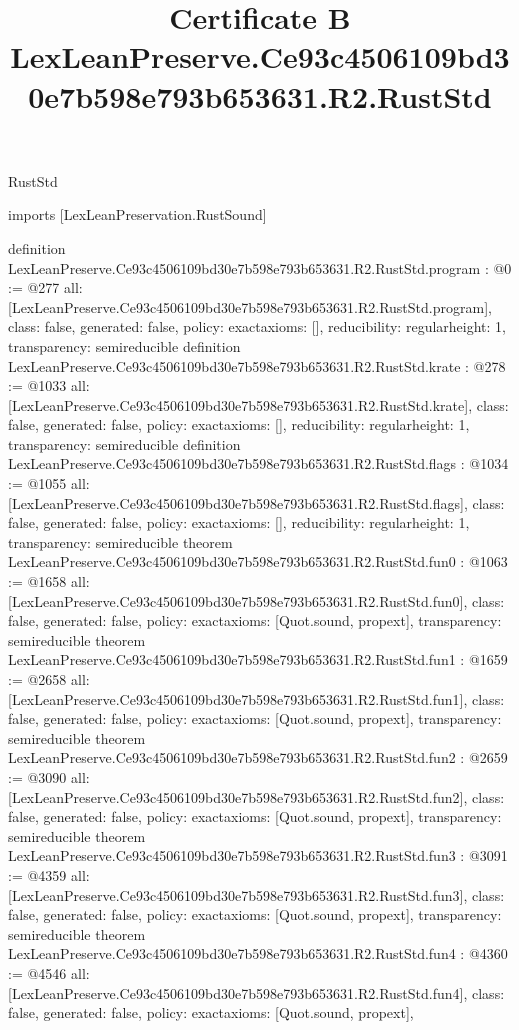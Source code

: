 \begin{lexlean}{RustStd}
\title{Certificate B LexLeanPreserve.Ce93c4506109bd30e7b598e793b653631.R2.RustStd}
\begin{coremodule}
imports [LexLeanPreservation.RustSound]

definition LexLeanPreserve.Ce93c4506109bd30e7b598e793b653631.R2.RustStd.program : @0 := @277 {
  all: [LexLeanPreserve.Ce93c4506109bd30e7b598e793b653631.R2.RustStd.program],
  class: false,
  generated: false,
  policy: exact{axioms: []},
  reducibility: regular{height: 1},
  transparency: semireducible
}
definition LexLeanPreserve.Ce93c4506109bd30e7b598e793b653631.R2.RustStd.krate : @278 := @1033 {
  all: [LexLeanPreserve.Ce93c4506109bd30e7b598e793b653631.R2.RustStd.krate],
  class: false,
  generated: false,
  policy: exact{axioms: []},
  reducibility: regular{height: 1},
  transparency: semireducible
}
definition LexLeanPreserve.Ce93c4506109bd30e7b598e793b653631.R2.RustStd.flags : @1034 := @1055 {
  all: [LexLeanPreserve.Ce93c4506109bd30e7b598e793b653631.R2.RustStd.flags],
  class: false,
  generated: false,
  policy: exact{axioms: []},
  reducibility: regular{height: 1},
  transparency: semireducible
}
theorem LexLeanPreserve.Ce93c4506109bd30e7b598e793b653631.R2.RustStd.fun0 : @1063 := @1658 {
  all: [LexLeanPreserve.Ce93c4506109bd30e7b598e793b653631.R2.RustStd.fun0],
  class: false,
  generated: false,
  policy: exact{axioms: [Quot.sound, propext]},
  transparency: semireducible
}
theorem LexLeanPreserve.Ce93c4506109bd30e7b598e793b653631.R2.RustStd.fun1 : @1659 := @2658 {
  all: [LexLeanPreserve.Ce93c4506109bd30e7b598e793b653631.R2.RustStd.fun1],
  class: false,
  generated: false,
  policy: exact{axioms: [Quot.sound, propext]},
  transparency: semireducible
}
theorem LexLeanPreserve.Ce93c4506109bd30e7b598e793b653631.R2.RustStd.fun2 : @2659 := @3090 {
  all: [LexLeanPreserve.Ce93c4506109bd30e7b598e793b653631.R2.RustStd.fun2],
  class: false,
  generated: false,
  policy: exact{axioms: [Quot.sound, propext]},
  transparency: semireducible
}
theorem LexLeanPreserve.Ce93c4506109bd30e7b598e793b653631.R2.RustStd.fun3 : @3091 := @4359 {
  all: [LexLeanPreserve.Ce93c4506109bd30e7b598e793b653631.R2.RustStd.fun3],
  class: false,
  generated: false,
  policy: exact{axioms: [Quot.sound, propext]},
  transparency: semireducible
}
theorem LexLeanPreserve.Ce93c4506109bd30e7b598e793b653631.R2.RustStd.fun4 : @4360 := @4546 {
  all: [LexLeanPreserve.Ce93c4506109bd30e7b598e793b653631.R2.RustStd.fun4],
  class: false,
  generated: false,
  policy: exact{axioms: [Quot.sound, propext]},
}
\end{coremodule}
\end{lexlean}
